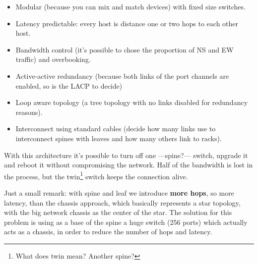 \begin{itemize}
   \item Modular (because you can mix and match devices) with fixed size switches.
   \item Latency predictable: every host is distance one or two hops to each other host.
   \item Bandwidth control (it's possible to chose the proportion of NS and EW traffic) and overbooking.
   \item Active-active redundancy (because both links of the port channels are enabled, so is the LACP to decide)
   \item Loop aware topology (a tree topology with no links disabled for redundancy reasons).
   \item Interconnect using standard cables (decide how many links use to interconnect spines with leaves and how many others link to racks).
   
\end{itemize}
With this architecture it’s possible to turn off one ---spine?--- switch, upgrade it and reboot it without compromising the network. Half of the bandwidth is lost in the process, but the twin\footnote{What does twin mean? Another spine?} switch keeps the connection alive.

Just a small remark: with spine and leaf we introduce \textbf{more hops}, so more latency, than the chassis approach, which basically represents a star topology, with the big network chassis as the center of the star. 
The solution for this problem is using as a base of the spine a huge switch (256 ports) which actually acts as a chassis, in order to reduce the number of hops and latency.

